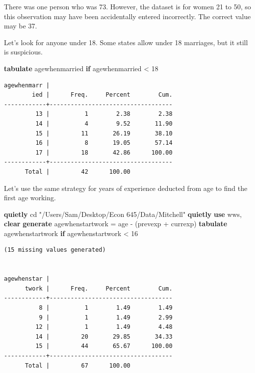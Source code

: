 \documentclass[
]{book}
\newenvironment{Shaded}{\begin{snugshade}}{\end{snugshade}}
\newcommand{\KeywordTok}[1]{\textcolor[rgb]{0.13,0.29,0.53}{\textbf{#1}}}
\newcommand{\NormalTok}[1]{#1}
\newcommand{\StringTok}[1]{\textcolor[rgb]{0.31,0.60,0.02}{#1}}
\begin{document}
There was one person who was 73. However, the dataset is for women 21 to 50, so this observation may have been accidentally entered incorrectly. The correct value may be 37.

Let's look for anyone under 18. Some states allow under 18 marriages, but
it still is suspicious.

\begin{Shaded}
\begin{Highlighting}[]
\KeywordTok{tabulate}\NormalTok{ agewhenmarried }\KeywordTok{if}\NormalTok{ agewhenmarried \textless{} 18}
\end{Highlighting}
\end{Shaded}

\begin{verbatim}
agewhenmarr |
        ied |      Freq.     Percent        Cum.
------------+-----------------------------------
         13 |          1        2.38        2.38
         14 |          4        9.52       11.90
         15 |         11       26.19       38.10
         16 |          8       19.05       57.14
         17 |         18       42.86      100.00
------------+-----------------------------------
      Total |         42      100.00
\end{verbatim}

Let's use the same strategy for years of experience deducted from age to find the first age working.

\begin{Shaded}
\begin{Highlighting}[]
\KeywordTok{quietly}\NormalTok{ cd }\StringTok{"/Users/Sam/Desktop/Econ 645/Data/Mitchell"}
\KeywordTok{quietly} \KeywordTok{use}\NormalTok{ wws, }\KeywordTok{clear}
\KeywordTok{generate}\NormalTok{ agewhenstartwork = age {-} (prevexp + currexp)}
\KeywordTok{tabulate}\NormalTok{ agewhenstartwork }\KeywordTok{if}\NormalTok{ agewhenstartwork \textless{} 16}
\end{Highlighting}
\end{Shaded}

\begin{verbatim}
(15 missing values generated)


agewhenstar |
      twork |      Freq.     Percent        Cum.
------------+-----------------------------------
          8 |          1        1.49        1.49
          9 |          1        1.49        2.99
         12 |          1        1.49        4.48
         14 |         20       29.85       34.33
         15 |         44       65.67      100.00
------------+-----------------------------------
      Total |         67      100.00
\end{verbatim}
\end{document}
